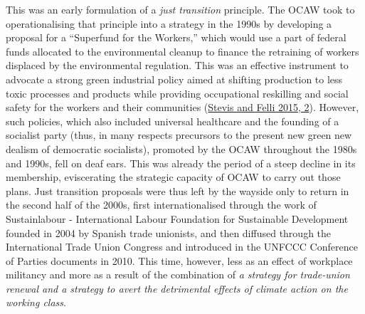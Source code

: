 \documentclass[a4paper, nobind]{templates/ociamthesis}
\begin{document}
This was an early formulation of a \emph{just transition} principle. The OCAW took to operationalising that principle into a strategy in the 1990s by developing a proposal for a ``Superfund for the Workers,'' which would use a part of federal funds allocated to the environmental cleanup to finance the retraining of workers displaced by the environmental regulation. This was an effective instrument to advocate a strong green industrial policy aimed at shifting production to less toxic processes and products while providing occupational reskilling and social safety for the workers and their communities (\protect\hyperlink{ref-stevis_global_2015}{Stevis and Felli 2015, 2}). However, such policies, which also included universal healthcare and the founding of a socialist party (thus, in many respects precursors to the present new green new dealism of democratic socialists), promoted by the OCAW throughout the 1980s and 1990s, fell on deaf ears. This was already the period of a steep decline in its membership, eviscerating the strategic capacity of OCAW to carry out those plans. Just transition proposals were thus left by the wayside only to return in the second half of the 2000s, first internationalised through the work of Sustainlabour - International Labour Foundation for Sustainable Development founded in 2004 by Spanish trade unionists, and then diffused through the International Trade Union Congress and introduced in the UNFCCC Conference of Parties documents in 2010. This time, however, less as an effect of workplace militancy and more as a result of the combination of \emph{a strategy for trade-union renewal and a strategy to avert the detrimental effects of climate action on the working class}.
\end{document}
